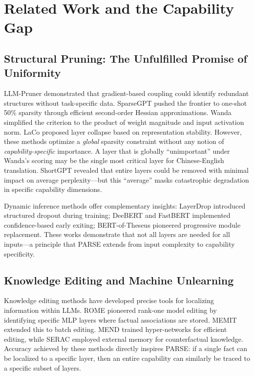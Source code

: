 \documentclass[twocolumn]{article}
\begin{document}
\section{Related Work and the Capability Gap}

\subsection{Structural Pruning: The Unfulfilled Promise of Uniformity}

LLM-Pruner \citep{ma2023llmpruner} demonstrated that gradient-based coupling could identify redundant structures without task-specific data.
SparseGPT \citep{frantar2023sparsegpt} pushed the frontier to one-shot 50\% sparsity through efficient second-order Hessian approximations.
Wanda \citep{sun2023wanda} simplified the criterion to the product of weight magnitude and input activation norm.
LaCo \citep{yang2024laco} proposed layer collapse based on representation stability.
However, these methods optimize a \emph{global} sparsity constraint without any notion of \emph{capability-specific} importance.
A layer that is globally ``unimportant'' under Wanda's scoring may be the single most critical layer for Chinese-English translation.
ShortGPT \citep{men2024shortgpt} revealed that entire layers could be removed with minimal impact on average perplexity---but this ``average'' masks catastrophic degradation in specific capability dimensions.

Dynamic inference methods offer complementary insights: LayerDrop \citep{fan2020layerdrop} introduced structured dropout during training; DeeBERT \citep{xin2020deebert} and FastBERT \citep{liu2020fastbert} implemented confidence-based early exiting; BERT-of-Theseus \citep{xu2020bertoftheseus} pioneered progressive module replacement.
These works demonstrate that not all layers are needed for all inputs---a principle that PARSE extends from input complexity to capability specificity.

\subsection{Knowledge Editing and Machine Unlearning}

Knowledge editing methods have developed precise tools for localizing information within LLMs.
ROME \citep{meng2022rome} pioneered rank-one model editing by identifying specific MLP layers where factual associations are stored.
MEMIT \citep{meng2023memit} extended this to batch editing.
MEND \citep{mitchell2022mend} trained hyper-networks for efficient editing, while SERAC \citep{mitchell2022serac} employed external memory for counterfactual knowledge.
Accuracy achieved by these methods directly inspires PARSE: if a single fact can be localized to a specific layer, then an entire capability can similarly be traced to a specific subset of layers.
\end{document}
